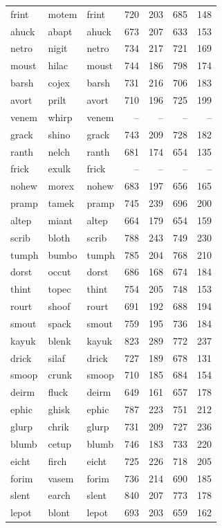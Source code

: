 \documentclass[
]{interact}
\begin{document}
\begin{longtable*}{lllrrrr}
frint & motem & frint & 720 & 203 & 685 & 148 \\ 
ahuck & abapt & ahuck & 673 & 207 & 633 & 153 \\ 
netro & nigit & netro & 734 & 217 & 721 & 169 \\ 
moust & hilac & moust & 744 & 186 & 798 & 174 \\ 
barsh & cojex & barsh & 731 & 216 & 706 & 183 \\ 
avort & prilt & avort & 710 & 196 & 725 & 199 \\ 
venem & whirp & venem & – & – & – & – \\ 
grack & shino & grack & 743 & 209 & 728 & 182 \\ 
ranth & nelch & ranth & 681 & 174 & 654 & 135 \\ 
frick & exulk & frick & – & – & – & – \\ 
nohew & morex & nohew & 683 & 197 & 656 & 165 \\ 
pramp & tamek & pramp & 745 & 239 & 696 & 200 \\ 
altep & miant & altep & 664 & 179 & 654 & 159 \\ 
scrib & bloth & scrib & 788 & 243 & 749 & 230 \\ 
tumph & bumbo & tumph & 785 & 204 & 768 & 210 \\ 
dorst & occut & dorst & 686 & 168 & 674 & 184 \\ 
thint & topec & thint & 754 & 205 & 748 & 153 \\ 
rourt & shoof & rourt & 691 & 192 & 688 & 194 \\ 
smout & spack & smout & 759 & 195 & 736 & 184 \\ 
kayuk & blenk & kayuk & 823 & 289 & 772 & 237 \\ 
drick & silaf & drick & 727 & 189 & 678 & 131 \\ 
smoop & crunk & smoop & 710 & 185 & 684 & 154 \\ 
deirm & fluck & deirm & 649 & 161 & 657 & 178 \\ 
ephic & ghisk & ephic & 787 & 223 & 751 & 212 \\ 
glurp & chrik & glurp & 731 & 209 & 727 & 236 \\ 
blumb & cetup & blumb & 746 & 183 & 733 & 220 \\ 
eicht & firch & eicht & 725 & 226 & 718 & 205 \\ 
forim & vasem & forim & 736 & 214 & 690 & 185 \\ 
slent & earch & slent & 840 & 207 & 773 & 178 \\ 
lepot & blont & lepot & 693 & 203 & 659 & 162 \\ 

\end{longtable*}
\end{document}
